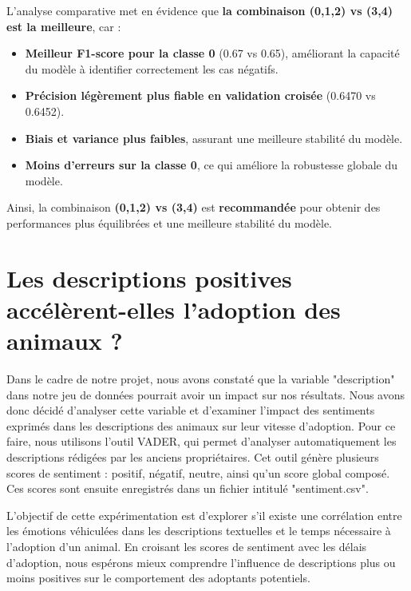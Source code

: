 \documentclass[a4paper,12pt]{article}
\begin{document}
\bigskip
 
 
L'analyse comparative met en évidence que \textbf{la combinaison (0,1,2) vs (3,4) est la meilleure}, car :
 
\begin{itemize}

    \item \textbf{Meilleur F1-score pour la classe 0} (0.67 vs 0.65), améliorant la capacité du modèle à identifier correctement les cas négatifs.

    \item \textbf{Précision légèrement plus fiable en validation croisée} (0.6470 vs 0.6452).

    \item \textbf{Biais et variance plus faibles}, assurant une meilleure stabilité du modèle.

    \item \textbf{Moins d'erreurs sur la classe 0}, ce qui améliore la robustesse globale du modèle.

\end{itemize}
 
Ainsi, la combinaison \textbf{(0,1,2) vs (3,4)} est \textbf{recommandée} pour obtenir des performances plus équilibrées et une meilleure stabilité du modèle.
 
 
 
\section{ Les descriptions positives accélèrent-elles l’adoption des animaux ?
 }

Dans le cadre de notre projet, nous avons constaté que la variable "description" dans notre jeu de données pourrait avoir un impact sur nos résultats. Nous avons donc décidé d'analyser cette variable et d'examiner l'impact des sentiments exprimés dans les descriptions des animaux sur leur vitesse d'adoption. Pour ce faire, nous utilisons l'outil VADER, qui permet d'analyser automatiquement les descriptions rédigées par les anciens propriétaires. Cet outil génère plusieurs scores de sentiment : positif, négatif, neutre, ainsi qu'un score global composé. Ces scores sont ensuite enregistrés dans un fichier intitulé "sentiment.csv".

L'objectif de cette expérimentation est d'explorer s'il existe une corrélation entre les émotions véhiculées dans les descriptions textuelles et le temps nécessaire à l'adoption d'un animal. En croisant les scores de sentiment avec les délais d'adoption, nous espérons mieux comprendre l'influence de descriptions plus ou moins positives sur le comportement des adoptants potentiels.
\end{document}
